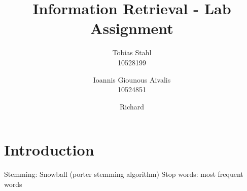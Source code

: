 \documentclass[11pt]{article}
\title{
	\textbf{Information Retrieval - Lab Assignment}
}
\author{Tobias Stahl \\ 10528199 \and Ioannis Giounous Aivalis \\ 10524851 \and Richard  \\ }
\begin{document}
\maketitle


\section{Introduction}


Stemming: Snowball (porter stemming algorithm)
Stop words: most frequent words

\begin{thebibliography}{9}

\end{thebibliography}
\end{document}

